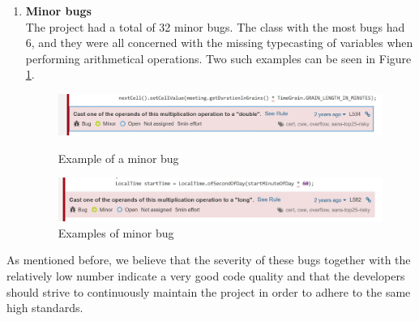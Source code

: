 \begin{enumerate}
                \item \textbf{Minor bugs}\\
                The project had a total of 32 minor bugs. The class with the most bugs had 6, and they were all concerned with the missing typecasting of variables when performing arithmetical operations. Two such examples can be seen in Figure \ref{fig:minorbugs}.
                \begin{figure}[H]
                    \centering
                    \includegraphics[scale=0.8]{figures/minorbug.JPG}
                    \caption{Example of a minor bug}
                    \includegraphics[scale=0.8]{figures/minorbug2.JPG}
                    \caption{Examples of minor bug}
                    \label{fig:minorbugs}
                \end{figure}
            \end{enumerate}
            
            As mentioned before, we believe that the severity of these bugs together with the relatively low number indicate a very good code quality and that the developers should strive to continuously maintain the project in order to adhere to the same high standards.
        
